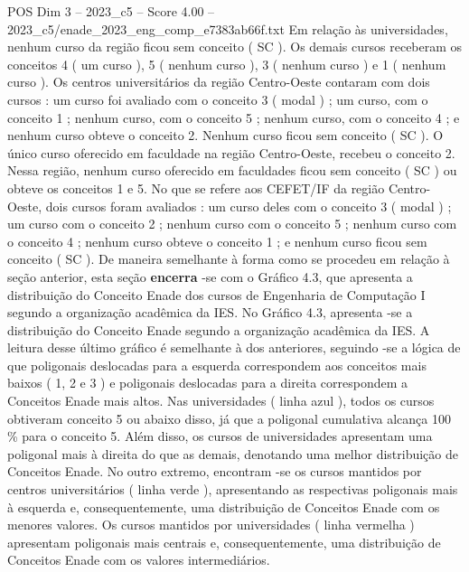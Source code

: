 \begin{textsample}{POS Dim 3 – 2023\_c5 – Score 4.00 – 2023\_c5/enade\_2023\_eng\_comp\_e7383ab66f.txt}
Em relação às universidades, nenhum curso da região ficou sem conceito ( SC ).
Os demais cursos receberam os conceitos 4 ( um curso ), 5 ( nenhum curso ), 3 ( nenhum curso ) e 1 ( nenhum curso ).
Os centros universitários da região Centro-Oeste contaram com dois cursos : um curso foi avaliado com o conceito 3 ( modal ) ; um curso, com o conceito 1 ; nenhum curso, com o conceito 5 ; nenhum curso, com o conceito 4 ; e nenhum curso obteve o conceito 2.
Nenhum curso ficou sem conceito ( SC ).
O único curso oferecido em faculdade na região Centro-Oeste, recebeu o conceito 2.
Nessa região, nenhum curso oferecido em faculdades ficou sem conceito ( SC ) ou obteve os conceitos 1 e 5.
No que se refere aos CEFET/IF da região Centro-Oeste, dois cursos foram avaliados : um curso deles com o conceito 3 ( modal ) ; um curso com o conceito 2 ; nenhum curso com o conceito 5 ; nenhum curso com o conceito 4 ; nenhum curso obteve o conceito 1 ; e nenhum curso ficou sem conceito ( SC ).
De maneira semelhante à forma como se procedeu em relação à seção anterior, esta seção \textbf{encerra} -se com o Gráfico 4.3, que apresenta a distribuição do Conceito Enade dos cursos de Engenharia de Computação I segundo a organização acadêmica da IES.
No Gráfico 4.3, apresenta -se a distribuição do Conceito Enade segundo a organização acadêmica da IES.
A leitura desse último gráfico é semelhante à dos anteriores, seguindo -se a lógica de que poligonais deslocadas para a esquerda correspondem aos conceitos mais baixos ( 1, 2 e 3 ) e poligonais deslocadas para a direita correspondem a Conceitos Enade mais altos.
Nas universidades ( linha azul ), todos os cursos obtiveram conceito 5 ou abaixo disso, já que a poligonal cumulativa alcança 100 \% para o conceito 5.
Além disso, os cursos de universidades apresentam uma poligonal mais à direita do que as demais, denotando uma melhor distribuição de Conceitos Enade.
No outro extremo, encontram -se os cursos mantidos por centros universitários ( linha verde ), apresentando as respectivas poligonais mais à esquerda e, consequentemente, uma distribuição de Conceitos Enade com os menores valores.
Os cursos mantidos por universidades ( linha vermelha ) apresentam poligonais mais centrais e, consequentemente, uma distribuição de Conceitos Enade com os valores intermediários.

\end{textsample}

